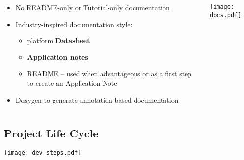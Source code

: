 \begin{frame}%
      
\begin{columns}
      \begin{column}{0.6\paperwidth}
         \centering
         \begin{itemize}
           \item No README-only or Tutorial-only documentation
           \item Industry-inspired documentation style:
             \begin{itemize}
               \item platform {\bf Datasheet}
               \item {\bf Application notes}
               \item README -- used when advantageous or as a first step to create an Application Note
             \end{itemize}
           \item Doxygen to generate annotation-based documentation
         \end{itemize}
      \end{column}
      \begin{column}{0.4\paperwidth}
         \centering
           \texttt{[image: docs.pdf]}\\
       \end{column}
    \end{columns}
  
\end{frame}



\subsection{Project Life Cycle}

\begin{frame}%
  \centering
  
  \texttt{[image: dev\_steps.pdf]}
  
\end{frame}



